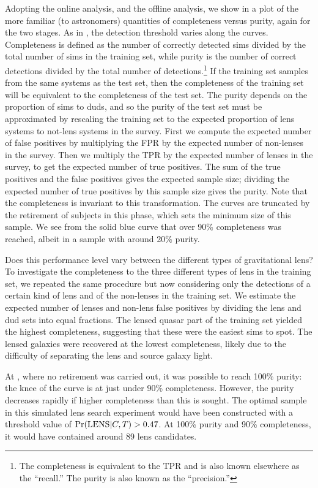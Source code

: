 \documentclass[useAMS,usenatbib,a4paper]{mn2e}
\begin{document}
Adopting the online \StageOne analysis, and the offline \StageTwo analysis, we
show in  a plot of the more familiar (to
astronomers) quantities of completeness versus purity, again for
the two stages. As in , the detection threshold
varies along the curves. Completeness is defined as the number of correctly
detected sims divided by the total number of sims in the training set, while
purity is the number of correct detections divided by the total number of
detections.\footnote{The completeness is equivalent to the TPR and is also
known elsewhere as the ``recall.''  The purity is also known as the
``precision.''} If the training set samples from the same systems as the test
set, then the completeness of the training set will be equivalent to the
completeness of the test set. The purity depends on the proportion of sims to
duds, and so the purity of the test set must be approximated by rescaling the
training set to the expected proportion of lens systems to not-lens systems in
the survey. First we compute the expected number of false positives by
multiplying the FPR by the expected number of non-lenses in the survey. Then
we multiply the TPR by the expected number of lenses in the survey, to get the
expected number of true positives. The sum of the true positives and the false
positives gives the expected sample size; dividing the expected number of true
positives by this sample size gives the purity. Note that the completeness is
invariant to this transformation.
The \StageOne curves are truncated by the retirement of subjects in this phase,
which sets the minimum size of this sample. We see from the solid blue curve
that over 90\% completeness was reached, albeit in a sample with around 20\%
purity.

Does this performance level vary between the different types of gravitational
lens? To investigate the completeness to the three different types of lens in
the training set, we repeated the same procedure but now considering only the
detections of a certain kind of lens and of the non-lenses in the training set.
We estimate the expected number of lenses and non-lens false positives by
dividing the lens and dud sets into equal fractions. The lensed quasar part of
the training set yielded the highest completeness, suggesting that these were
the easiest sims to spot. The lensed galaxies were recovered at the lowest
completeness, likely due to the difficulty  of separating the lens and source
galaxy light.

At \StageTwo, where no retirement was carried out, it was possible to reach
100\% purity: the knee of the curve is at just under 90\% completeness. However,
the purity decreases rapidly if higher completeness than this is sought. The
optimal sample in this simulated lens search experiment would have been
constructed with a threshold value of ${\rm Pr}({\rm LENS}|C,T) > 0.47$. At 100\% purity
and 90\% completeness, it would have contained around 89 lens candidates.
\end{document}
